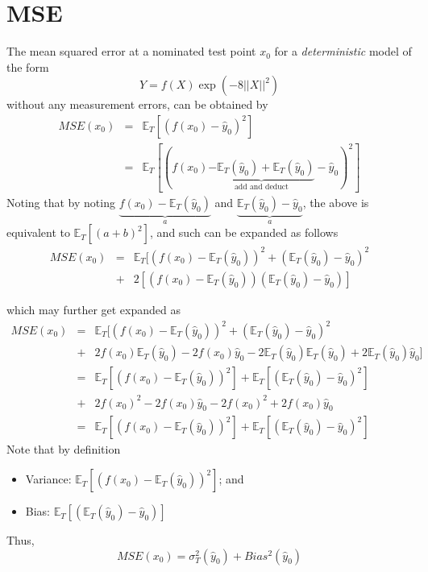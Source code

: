 \documentclass{beamer}
\newcommand{\E}{\mathbb{E}}
\begin{document}
\section{MSE}
\begin{frame}
The mean squared error at a nominated test point $x_0$ for a \textit{deterministic} model of the form
\[
Y=f(X)\exp(-8\lvert\lvert X\rvert\rvert^2)
\]
without any measurement errors, can be obtained by
\begin{eqnarray*}
MSE(x_0)&=&\E_{T}[(f(x_0)-\hat{y}_0)^2]\\
&=&\E_{T}[(f(x_0)\underbrace{-\E_T(\hat{y}_0)+\E_T(\hat{y}_0)}_{\text{add and deduct}}-\hat{y}_0)^2]
\end{eqnarray*}
Noting that by noting $\underbrace{f(x_0)-\E_T(\hat{y}_0)}_{a}$ and $\underbrace{\E_T(\hat{y}_0)-\hat{y}_0}_{a}$, the above is equivalent to $\E_T[(a+b)^2]$, and such can be expanded as follows
\begin{eqnarray*}
MSE(x_0)&=&\E_{T}[(f(x_0)-\E_T(\hat{y}_0))^2+(\E_T(\hat{y}_0)-\hat{y}_0)^2\\
&+&2[(f(x_0)-\E_T(\hat{y}_0))(\E_T(\hat{y}_0)-\hat{y}_0)]
\end{eqnarray*}
\end{frame}

\begin{frame}
which may further get expanded as
\begin{eqnarray*}
MSE(x_0)&=&\E_{T}[(f(x_0)-\E_T(\hat{y}_0))^2+(\E_T(\hat{y}_0)-\hat{y}_0)^2\\
&+&2f(x_0)\E_T(\hat{y}_0)-2f(x_0)\hat{y}_0-2\E_T(\hat{y}_0)\E_T(\hat{y}_0)+2\E_T(\hat{y}_0)\hat{y}_0]\\
&=&\E_{T}[(f(x_0)-\E_T(\hat{y}_0))^2]+\E_T[(\E_T(\hat{y}_0)-\hat{y}_0)^2]\\
&+&2f(x_0)^2-2f(x_0)\hat{y}_0-2f(x_0)^2+2f(x_0)\hat{y}_0\\
&=&\E_{T}[(f(x_0)-\E_T(\hat{y}_0))^2]+\E_T[(\E_T(\hat{y}_0)-\hat{y}_0)^2]
\end{eqnarray*}
Note that by definition
\begin{itemize}
\item{} Variance: $\E_{T}[(f(x_0)-\E_T(\hat{y}_0))^2]$; and
\item{} Bias: $\E_T[(\E_T(\hat{y}_0)-\hat{y}_0)]$
\end{itemize}
Thus,
\begin{equation}
MSE(x_0)=\sigma^2_T(\hat{y}_0)+Bias^2(\hat{y}_0)
\end{equation}
\end{frame}
\end{document}
